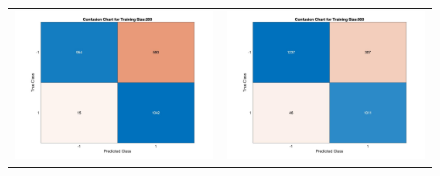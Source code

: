 \documentclass[11pt]{article}
\begin{document}
\begin{figure}[H]
	\centering
	\begin{adjustbox}{width=0.9\paperwidth}
		\begin{tabular}{c c}
			\includegraphics{Codes/Results/Logistic Train/Conf_Chart_Train_Size_200} & \includegraphics{Codes/Results/Logistic Train/Conf_Chart_Train_Size_500}\\ 

\end{tabular}
\end{adjustbox}
\end{figure}
\end{document}

